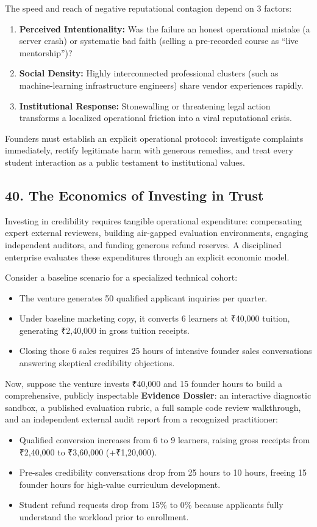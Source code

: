 The speed and reach of negative reputational contagion depend on 3 factors:
\begin{enumerate}
\item \textbf{Perceived Intentionality:} Was the failure an honest operational mistake (a server crash) or systematic bad faith (selling a pre-recorded course as ``live mentorship'')?
\item \textbf{Social Density:} Highly interconnected professional clusters (such as machine-learning infrastructure engineers) share vendor experiences rapidly.
\item \textbf{Institutional Response:} Stonewalling or threatening legal action transforms a localized operational friction into a viral reputational crisis.
\end{enumerate}

Founders must establish an explicit operational protocol: investigate complaints immediately, rectify legitimate harm with generous remedies, and treat every student interaction as a public testament to institutional values.

\subsection*{40. The Economics of Investing in Trust}

Investing in credibility requires tangible operational expenditure: compensating expert external reviewers, building air-gapped evaluation environments, engaging independent auditors, and funding generous refund reserves. A disciplined enterprise evaluates these expenditures through an explicit economic model.

Consider a baseline scenario for a specialized technical cohort:
\begin{itemize}
\item The venture generates 50 qualified applicant inquiries per quarter.
\item Under baseline marketing copy, it converts 6 learners at ₹40,000 tuition, generating ₹2,40,000 in gross tuition receipts.
\item Closing those 6 sales requires 25 hours of intensive founder sales conversations answering skeptical credibility objections.
\end{itemize}

Now, suppose the venture invests ₹40,000 and 15 founder hours to build a comprehensive, publicly inspectable \textbf{Evidence Dossier}: an interactive diagnostic sandbox, a published evaluation rubric, a full sample code review walkthrough, and an independent external audit report from a recognized practitioner:
\begin{itemize}
\item Qualified conversion increases from 6 to 9 learners, raising gross receipts from ₹2,40,000 to ₹3,60,000 (+₹1,20,000).
\item Pre-sales credibility conversations drop from 25 hours to 10 hours, freeing 15 founder hours for high-value curriculum development.
\item Student refund requests drop from 15\% to 0\% because applicants fully understand the workload prior to enrollment.
\end{itemize}

